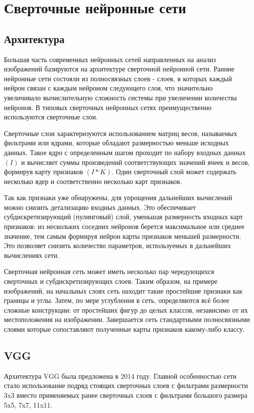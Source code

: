 \section{Сверточные нейронные сети} \label{CNN}

\subsection{Архитектура}

Большая часть современных нейронных сетей направленных на анализ изображений базируются на архитектуре сверточной нейронной сети.
Ранние нейронные сети состояли из полносвязных слоев - слоев, в которых каждый нейрон связан с каждым нейроном следующего слоя, что значительно увеличивало вычислительную сложность системы при увеличении количества нейронов. 
В типовых сверточных нейронных сетях преимущественно используются сверточные слои. 

Сверточные слои характеризуются использованием матриц весов, называемых фильтрами или ядрами, которые обладают размерностью меньше исходных данных. Такое ядро с определенным шагом проходит по набору входных данных $(I)$ и вычисляет суммы произведений соответствующих значений ячеек и весов, формируя карту признаков $(I * K)$. Один сверточный слой может содержать несколько ядер и соответственно несколько карт признаков.



Так как признаки уже обнаружены, для упрощения дальнейших вычислений можно снизить детализацию входных данных. Это обеспечивает субдискретизирующий (пулинговый) слой, уменьшая размерность входных карт признаков: из нескольких соседних нейронов берется максимальное или среднее значение, тем самым формируя нейрон карты признаков меньшей размерности. Это позволяет снизить количество параметров, используемых в дальнейших вычислениях сети. 



Сверточная нейронная сеть может иметь несколько пар чередующихся сверточных и субдискретизирующих слоев. 
Таким образом, на примере изображений, на начальных слоях сеть находит такие простейшие признаки как границы и углы. Затем, по мере углубления в сеть, определяются всё более сложные конструкции: от простейших фигур до целых классов, независимо от их местоположения на изображении. Завершается сеть стандартными полносвязными слоями которые сопоставляют полученные карты признаков какому-либо классу.  

\subsection{VGG}
Архитектура VGG была предложена в 2014 году\cite{simonyan2014convolutional}. Главной особенностью сети стало использование подряд стоящих сверточных слоев с фильтрами размерности 3x3 вместо применяемых ранее сверточных слоев с фильтрами большого размера 5x5, 7x7, 11x11. 

